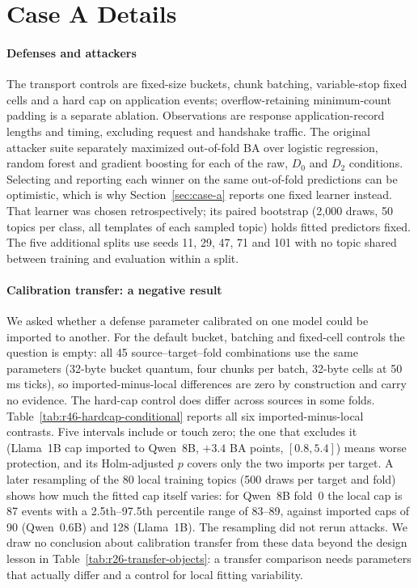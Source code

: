 \section{Case A Details}\label{app:case-a}\label{app:boundary-experiments}
\paragraph{Defenses and attackers}
The transport controls are fixed-size buckets, chunk batching, variable-stop fixed cells and a hard cap on application events; overflow-retaining minimum-count padding is a separate ablation. Observations are response application-record lengths and timing, excluding request and handshake traffic. The original attacker suite separately maximized out-of-fold BA over logistic regression, random forest and gradient boosting for each of the raw, $D_0$ and $D_2$ conditions. Selecting and reporting each winner on the same out-of-fold predictions can be optimistic, which is why Section~\ref{sec:case-a} reports one fixed learner instead. That learner was chosen retrospectively; its paired bootstrap (2,000 draws, 50 topics per class, all templates of each sampled topic) holds fitted predictors fixed. The five additional splits use seeds 11, 29, 47, 71 and 101 with no topic shared between training and evaluation within a split.

\paragraph{Calibration transfer: a negative result}
We asked whether a defense parameter calibrated on one model could be imported to another. For the default bucket, batching and fixed-cell controls the question is empty: all 45 source--target--fold combinations use the same parameters (32-byte bucket quantum, four chunks per batch, 32-byte cells at 50\,ms ticks), so imported-minus-local differences are zero by construction and carry no evidence. The hard-cap control does differ across sources in some folds. Table~\ref{tab:r46-hardcap-conditional} reports all six imported-minus-local contrasts. Five intervals include or touch zero; the one that excludes it (Llama~1B cap imported to Qwen~8B, $+3.4$ BA points, $[0.8, 5.4]$) means worse protection, and its Holm-adjusted $p$ covers only the two imports per target. A later resampling of the 80 local training topics (500 draws per target and fold) shows how much the fitted cap itself varies: for Qwen~8B fold~0 the local cap is 87 events with a 2.5th--97.5th percentile range of 83--89, against imported caps of 90 (Qwen~0.6B) and 128 (Llama~1B). The resampling did not rerun attacks. We draw no conclusion about calibration transfer from these data beyond the design lesson in Table~\ref{tab:r26-transfer-objects}: a transfer comparison needs parameters that actually differ and a control for local fitting variability.

